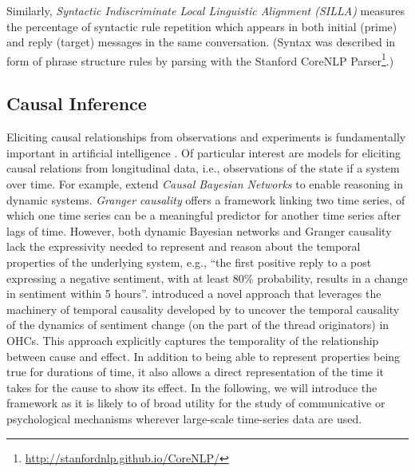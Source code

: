 
Similarly, \emph{Syntactic Indiscriminate Local Linguistic Alignment (SILLA)} measures the percentage of syntactic rule repetition which appears in both initial (prime) and reply (target) messages in the same conversation. (Syntax was described in form of phrase structure rules by parsing with the Stanford CoreNLP Parser\footnote{\url{http://stanfordnlp.github.io/CoreNLP/}}.)

\subsection{Causal Inference}
Eliciting causal relationships from observations and experiments is fundamentally important in artificial intelligence \parencite{Pearl2000Causality,Spirtes2000,pearl2016causal}. Of particular interest are models for eliciting causal relations from longitudinal data, i.e., observations of the state if a system over time. For example, \textcite{dagum1992dynamic,ghahramani1998learning} extend \emph{Causal Bayesian Networks} to enable reasoning in dynamic systems. \emph{Granger causality} \parencite{granger1969investigating} offers a framework linking two time series, of which one time series can be a meaningful predictor for another time series after lags of time. However, both dynamic Bayesian networks and Granger causality lack the expressivity needed to represent and reason about the temporal properties of the underlying system, e.g., ``the first positive reply to a post expressing a negative sentiment, with at least 80\% probability, results in a change in sentiment within 5 hours''. \textcite{bui2016temporal} introduced a novel approach that leverages the machinery of temporal causality developed by \textcite{kleinberg_uai09} to uncover the temporal causality of the dynamics of sentiment change (on the part of the thread originators) in OHCs. This approach explicitly captures the temporality of the relationship between cause and effect. In addition to being able to represent properties being true for durations of time, it also allows a direct representation of the time it takes for the cause to show its effect. In the following, we will introduce the framework as it is likely to of broad utility for the study of communicative or psychological mechanisms wherever large-scale time-series data are used.


